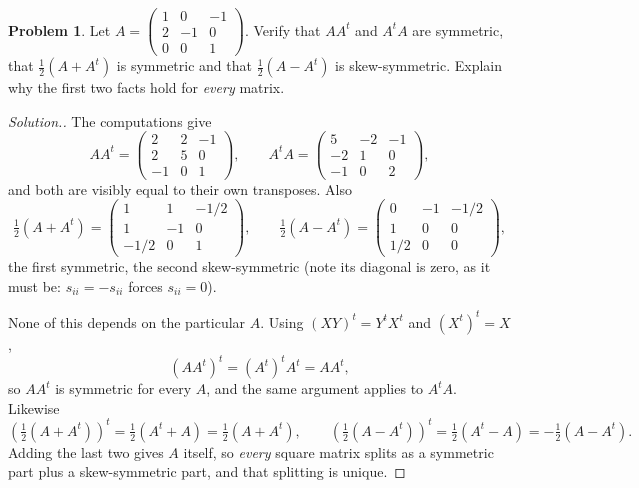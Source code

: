 \documentclass[11pt,a4paper]{article}
\theoremstyle{definition}
\newtheorem{problemx}{Problem}[section]
\newenvironment{problem}{\begin{problemx}}{\end{problemx}}
\newenvironment{solution}
  {\renewcommand{\qedsymbol}{}\begin{proof}[\textit{Solution}.]}
  {\end{proof}}
\begin{document}
\begin{problem}
Let $A=\begin{pmatrix}1&0&-1\\2&-1&0\\0&0&1\end{pmatrix}$. Verify that $AA^t$
and $A^tA$ are symmetric, that $\frac{1}{2}(A+A^t)$ is symmetric and that
$\frac{1}{2}(A-A^t)$ is skew-symmetric. Explain why the first two facts hold
for \emph{every} matrix.
\end{problem}
\begin{solution}
The computations give
$$AA^t=\begin{pmatrix}2&2&-1\\2&5&0\\-1&0&1\end{pmatrix},\qquad
  A^tA=\begin{pmatrix}5&-2&-1\\-2&1&0\\-1&0&2\end{pmatrix},$$
and both are visibly equal to their own transposes. Also
$$\tfrac{1}{2}(A+A^t)=\begin{pmatrix}1&1&-1/2\\1&-1&0\\-1/2&0&1\end{pmatrix},
\qquad
  \tfrac{1}{2}(A-A^t)=\begin{pmatrix}0&-1&-1/2\\1&0&0\\1/2&0&0\end{pmatrix},$$
the first symmetric, the second skew-symmetric (note its diagonal is zero, as
it must be: $s_{ii}=-s_{ii}$ forces $s_{ii}=0$).

None of this depends on the particular $A$. Using $(XY)^t=Y^tX^t$ and
$(X^t)^t=X$,
$$(AA^t)^t=(A^t)^tA^t=AA^t,$$
so $AA^t$ is symmetric for every $A$, and the same argument applies to $A^tA$.
Likewise
$$\left(\tfrac{1}{2}(A+A^t)\right)^t=\tfrac{1}{2}(A^t+A)=\tfrac{1}{2}(A+A^t),
\qquad
\left(\tfrac{1}{2}(A-A^t)\right)^t=\tfrac{1}{2}(A^t-A)=-\tfrac{1}{2}(A-A^t).$$
Adding the last two gives $A$ itself, so \emph{every} square matrix splits as a
symmetric part plus a skew-symmetric part, and that splitting is unique.
\end{solution}
\end{document}
